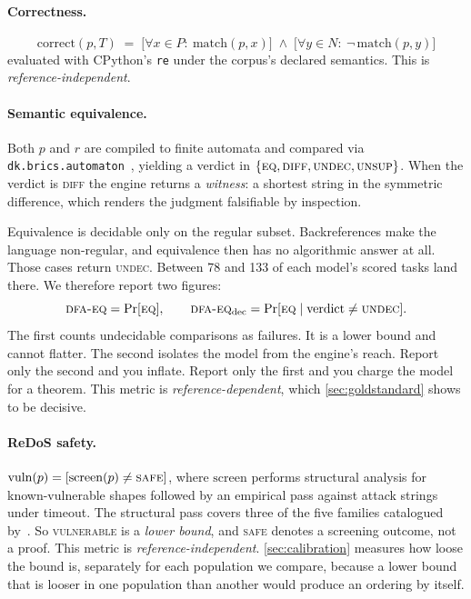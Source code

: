 \documentclass[11pt]{article}
\newcommand{\vuln}{\textsc{vulnerable}}
\newcommand{\dfaeq}{\textsc{dfa-eq}}
\begin{document}
\paragraph{Correctness.}
\[
\mathrm{correct}(p,T) \;=\; \big[\forall x \in P:\ \mathrm{match}(p,x)\big]
\;\wedge\;
\big[\forall y \in N:\ \neg\,\mathrm{match}(p,y)\big]
\]
evaluated with CPython's \texttt{re} under the corpus's declared semantics.
This is \emph{reference-independent}.

\paragraph{Semantic equivalence.}
Both $p$ and $r$ are compiled to finite automata and compared via
\texttt{dk.brics.automaton}~\citep{brics}, yielding a
verdict in $\{\textsc{eq}, \textsc{diff}, \textsc{undec}, \textsc{unsup}\}$.
When the verdict is \textsc{diff} the engine returns a \emph{witness}: a
shortest string in the symmetric difference, which renders the judgment
falsifiable by inspection.

Equivalence is decidable only on the regular subset. Backreferences make the
language non-regular, and equivalence then has no algorithmic answer at all.
Those cases return \textsc{undec}. Between 78 and 133 of each model's
scored tasks land there.
We therefore report two figures:
\[
\dfaeq{} = \Pr[\textsc{eq}], \qquad
\dfaeq{}_{\text{dec}} = \Pr[\textsc{eq} \mid \text{verdict} \neq \textsc{undec}].
\]
The first counts undecidable comparisons as failures. It is a lower bound
and cannot flatter. The second isolates the model from the engine's reach.
Report only the second and you inflate. Report only the first and you charge
the model for a theorem. This metric is \emph{reference-dependent}, which
\cref{sec:goldstandard} shows to be decisive.

\paragraph{ReDoS safety.}
$\mathrm{vuln}(p) = [\mathrm{screen}(p) \neq \textsc{safe}]$, where
$\mathrm{screen}$ performs structural analysis for known-vulnerable shapes
followed by an empirical pass against attack strings under timeout. The
structural pass covers three of the five families catalogued
by~\citet{siddiq2024redos}. So \vuln{} is a \emph{lower bound}, and
\textsc{safe} denotes a screening outcome, not a proof. This metric is
\emph{reference-independent}. \cref{sec:calibration} measures how loose the
bound is, separately for each population we compare, because a lower bound
that is looser in one population than another would produce an ordering by
itself.
\end{document}

